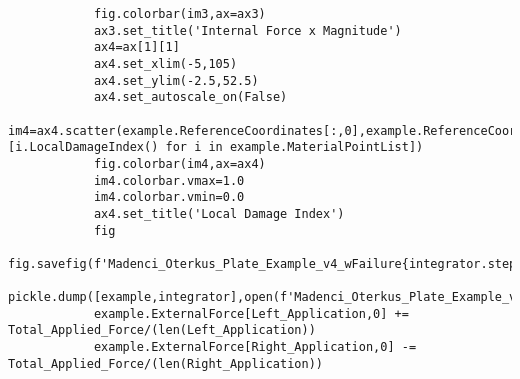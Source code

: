 \documentclass[10pt,a4paper,onecolumn]{article}
\begin{document}
\begin{verbatim}
            fig.colorbar(im3,ax=ax3)
            ax3.set_title('Internal Force x Magnitude')
            ax4=ax[1][1]
            ax4.set_xlim(-5,105)
            ax4.set_ylim(-2.5,52.5)
            ax4.set_autoscale_on(False)
            im4=ax4.scatter(example.ReferenceCoordinates[:,0],example.ReferenceCoordinates[:,1],c=[i.LocalDamageIndex() for i in example.MaterialPointList])
            fig.colorbar(im4,ax=ax4)
            im4.colorbar.vmax=1.0
            im4.colorbar.vmin=0.0
            ax4.set_title('Local Damage Index')
            fig
            fig.savefig(f'Madenci_Oterkus_Plate_Example_v4_wFailure{integrator.step}')
            pickle.dump([example,integrator],open(f'Madenci_Oterkus_Plate_Example_v4_wFailure{integrator.step}','wb'))
            example.ExternalForce[Left_Application,0] += Total_Applied_Force/(len(Left_Application))
            example.ExternalForce[Right_Application,0] -= Total_Applied_Force/(len(Right_Application))
\end{verbatim}
\end{document}
